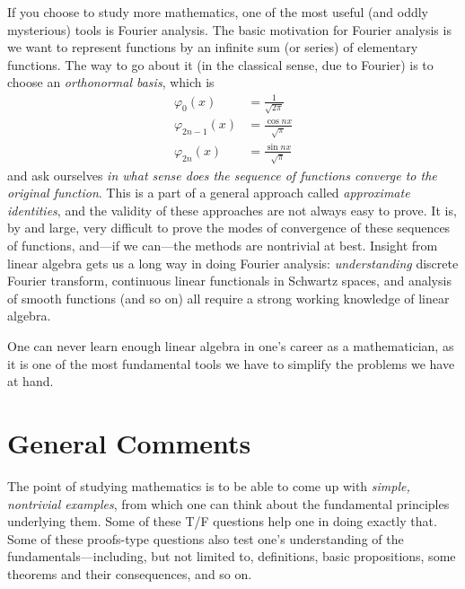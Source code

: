 \documentclass{amsart}
\theoremstyle{definition}
\theoremstyle{definition}
\DeclareMathOperator{\1}{\mathbbm{1}}
\renewcommand{\phi}{\varphi}
\begin{document}
\begin{enumerate}
		If you choose to study more mathematics, one of the most useful (and oddly mysterious) tools is Fourier analysis. The basic motivation for Fourier analysis is we want to represent functions by an infinite sum (or series) of elementary functions. The way to go about it (in the classical sense, due to Fourier) is to choose an \textit{orthonormal basis}, which is
		\begin{equation}
		\label{eqtrigonset}
		\begin{aligned}
		\phi_0 (x) &= \frac{1}{\sqrt{2\pi}} \\
		\phi_{2n-1} (x) &= \frac{\cos nx}{\sqrt{\pi}} \\
		\phi_{2n} (x) &= \frac{\sin nx}{\sqrt{\pi}} 
		\end{aligned}
		\end{equation}
		and ask ourselves \textit{in what sense does the sequence of functions converge to the original function}. This is a part of a general approach called \textit{approximate identities}, and the validity of these approaches are not always easy to prove. It is, by and large, very difficult to prove the modes of convergence of these sequences of functions, and---if we can---the methods are nontrivial at best. Insight from linear algebra gets us a long way in doing Fourier analysis: \textit{understanding} discrete Fourier transform, continuous linear functionals in Schwartz spaces, and analysis of smooth functions (and so on) all require a strong working knowledge of linear algebra.
		
		One can never learn enough linear algebra in one's career as a mathematician, as it is one of the most fundamental tools we have to simplify the problems we have at hand.
	\end{enumerate}
	
	\clearpage
	
	
	
\section*{General Comments}


The point of studying mathematics is to be able to come up with \textit{simple, nontrivial examples}, from which one can think about the fundamental principles underlying them. Some of these T/F questions help one in doing exactly that. Some of these proofs-type questions also test one's understanding of the fundamentals---including, but not limited to, definitions, basic propositions, some theorems and their consequences, and so on.
\end{document}
